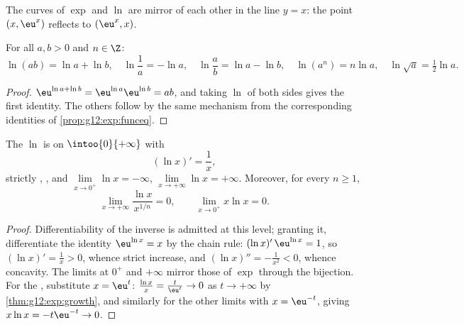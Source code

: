 \begin{omfigure}

{\small The curves of $\exp$ and $\ln$ are mirror  of each other
in the line $y = x$: the point $(x, \eu^x)$ reflects to $(\eu^x, x)$.}
\end{omfigure}

\begin{proposition}\label{prop:g12:exp:lnalg}
For all $a, b > 0$ and $n \in \Z$:
\[
\ln(ab) = \ln a + \ln b, \quad
\ln\frac{1}{a} = -\ln a, \quad
\ln\frac{a}{b} = \ln a - \ln b, \quad
\ln(a^n) = n \ln a, \quad
\ln\sqrt{a} = \tfrac12 \ln a .
\]
\end{proposition}

\begin{proof}
$\eu^{\ln a + \ln b} = \eu^{\ln a}\eu^{\ln b} = ab$, and taking $\ln$ of both
sides gives the first identity. The others follow by the same mechanism from
the corresponding identities of \cref{prop:g12:exp:funceq}.
\end{proof}

\begin{proposition}\label{prop:g12:exp:lnanalytic}
The  $\ln$ is  on $\intoo{0}{+\infty}$ with
\[
(\ln x)' = \frac{1}{x},
\]
strictly , , and
$\lim\limits_{x\to0^+} \ln x = -\infty$,
$\lim\limits_{x\to+\infty} \ln x = +\infty$. Moreover, for every 
$n \geq 1$,
\[
\lim_{x\to+\infty} \frac{\ln x}{x^{1/n}} = 0, \qquad
\lim_{x\to0^+} x \ln x = 0 .
\]
\end{proposition}

\begin{proof}
Differentiability of the inverse  is admitted at this level; granting
it, differentiate the identity $\eu^{\ln x} = x$ by the chain rule:
$(\ln x)'\,\eu^{\ln x} = 1$, so $(\ln x)' = \frac{1}{x} > 0$, whence strict
increase, and $(\ln x)'' = -\frac1{x^2} < 0$, whence concavity. The limits at
$0^+$ and $+\infty$ mirror those of $\exp$ through the bijection. For the
, substitute $x = \eu^{t}$:
$\frac{\ln x}{x} = \frac{t}{\eu^t} \to 0$ as $t \to +\infty$ by
\cref{thm:g12:exp:growth}, and similarly for the other limits with
$x = \eu^{-t}$, giving $x\ln x = -t\eu^{-t} \to 0$.
\end{proof}

